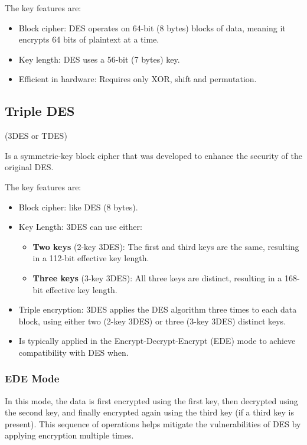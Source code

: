The key features are:
\begin{itemize}
    \item Block cipher: DES operates on 64-bit (8 bytes) blocks of data, meaning it encrypts 64 bits of plaintext at a time.
    \item Key length: DES uses a 56-bit (7 bytes) key.
    \item Efficient in hardware: Requires only XOR, shift and permutation.
\end{itemize}

\subsection{Triple DES}
\begin{center}
    (3DES or TDES)
\end{center}

Is a symmetric-key block cipher that was developed to enhance the security of the original DES.

The key features are:
\begin{itemize}
    \item Block cipher: like DES (8 bytes).
    \item Key Length: 3DES can use either:
    \begin{itemize}
        \item \textbf{Two keys} (2-key 3DES): The first and third keys are the same, resulting in a 112-bit effective key length.
        \item \textbf{Three keys} (3-key 3DES): All three keys are distinct, resulting in a 168-bit effective key length.
    \end{itemize}
    \item Triple encryption: 3DES applies the DES algorithm three times to each data block, using either two (2-key 3DES) or three (3-key 3DES) distinct keys.
    \item Is typically applied in the Encrypt-Decrypt-Encrypt (EDE) mode to achieve compatibility with DES when.
\end{itemize}

\subsubsection{EDE Mode}
In this mode, the data is first encrypted using the first key, then decrypted using the second key, and finally encrypted again using the third key (if a third key is present). This sequence of operations helps mitigate the vulnerabilities of DES by applying encryption multiple times.

